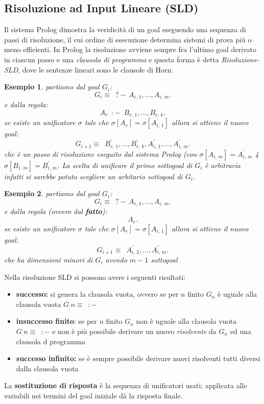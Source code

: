 \documentclass[a4paper]{report}
\newtheorem{esempio}{Esempio}
\begin{document}
\subsection{Risoluzione ad Input Lineare (SLD)}
Il sistema Prolog dimostra la veridicità di un goal eseguendo una sequenza di passi di risoluzione, il cui ordine di esecuzione
determina sistemi di prova più o meno efficienti.\newline
In Prolog la risoluzione avviene sempre fra l’ultimo goal derivato in ciascun passo e una \emph{clausola di programma}
e questa forma è detta \emph{Risoluzione-SLD}, dove le sentenze lineari sono le clausole di Horn.
\begin{esempio}
partiamo dal goal $G_i$:
$$G_i\equiv \,\,\,?-\, A_{i,\, 1}, ...,  A_{i,\, m}.$$
e dalla regola:
$$A_r\,\,\,:-\,\,\, B_{r,\,1},..., B_{r,\,k}.$$
se esiste un unificatore $\sigma$ tale che $\sigma[A_r]=\sigma[A_{i,\,1}]$ allora si ottiene il nuovo goal:
$$G_{i+1}\equiv\,\,\,B^{'}_{r,\,1},..., B^{'}_{r,\,k},A^{'}_{i,\, 1}, ...,  A^{'}_{i,\, m}.$$
che è un passo di risoluzione eseguito dal sistema Prolog (con $\sigma[A_{i,\,m}]=A^{'}_{i,\,m}$ 4 $\sigma[B_{i,\,m}]=B^{'}_{i,\,m}$.
La scelta di unificare il primo sottogoal di $G_i$ è arbitraria infatti si sarebbe potuto scegliere un arbitario sottogoal di $G_i$.
\end{esempio}
\begin{esempio}
partiamo dal goal $G_i$:
$$G_i\equiv \,\,\,?-\, A_{i,\, 1}, ...,  A_{i,\, m}.$$
e dalla regola (ovvero dal \textbf{fatto}):
$$A_r.$$
se esiste un unificatore $\sigma$ tale che $\sigma[A_r]=\sigma[A_{i,\,1}]$ allora si ottiene il nuovo goal:
$$G_{i+1}\equiv\,\,\,A^{'}_{i,\, 2}, ...,  A^{'}_{i,\, m}.$$
che ha dimensioni minori di $G_i$ avendo $m-1$ sottogoal
\end{esempio}
Nella risoluzione SLD si possono avere i seguenti risultati:
\begin{itemize}
\item \textbf{successo:} si genera la clausola vuota, ovvero se per $n$ finito $G_n$ è uguale alla clausola vuota $G_:n\equiv\,\,\,:-$
\item \textbf{insuccesso finito}: se per $n$ finito $G_n$  non è uguale alla clausola vuota $G_:n\equiv\,\,\,:-$ e non è più possibile derivare un nuovo \textit{risolvente} da $G_n$ ed una clausola d programma
\item \textbf{successo infinito: }se è sempre possibile derivare nuovi risolventi tutti diversi dalla clausola vuota
\end{itemize}
La \textbf{sostituzione di risposta} è la sequenza di unificatori usati; applicata alle variabili nei termini del goal iniziale dà la risposta finale.\\
\end{document}
